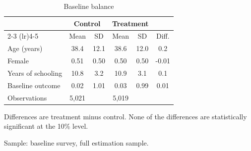 %

\begin{table}[htbp]\centering
\caption{Baseline balance}
\label{tab:balance}
\begin{threeparttable}
\begin{tabular}{lccccc}
\toprule
                        & \multicolumn{2}{c}{Control} & \multicolumn{2}{c}{Treatment} & \\
\cmidrule(lr){2-3} \cmidrule(lr){4-5}
                        & Mean & SD & Mean & SD & Diff. \\
\midrule
Age (years)             & 38.4 & 12.1 & 38.6 & 12.0 &  0.2     \\
Female                  & 0.51 & 0.50 & 0.50 & 0.50 & -0.01    \\
Years of schooling      & 10.8 & 3.2  & 10.9 & 3.1  &  0.1     \\
Baseline outcome        & 0.02 & 1.01 & 0.03 & 0.99 &  0.01    \\
\midrule
Observations            & 5{,}021 & & 5{,}019 & & \\
\bottomrule
\end{tabular}
\begin{tablenotes}\footnotesize
\item Differences are treatment minus control. None of the differences
      are statistically significant at the 10\% level.
\item Sample: baseline survey, full estimation sample.
\end{tablenotes}
\end{threeparttable}
\end{table}
